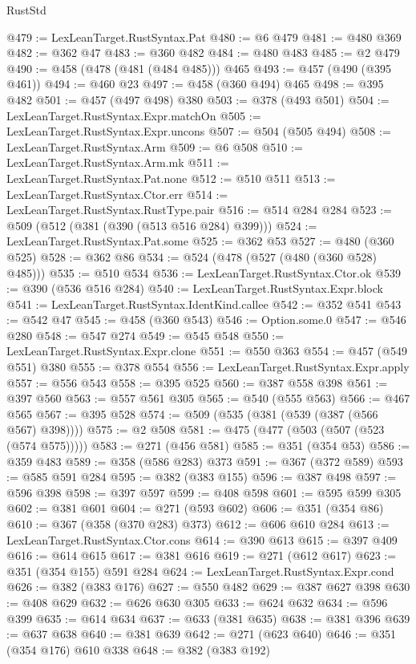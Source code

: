 \begin{lexlean}{RustStd}
\begin{coremodule}
@479 := LexLeanTarget.RustSyntax.Pat
@480 := @6 @479
@481 := @480 @369
@482 := @362 @47
@483 := @360 @482
@484 := @480 @483
@485 := @2 @479
@490 := @458 (@478 (@481 (@484 @485))) @465
@493 := @457 (@490 (@395 @461))
@494 := @460 @23
@497 := @458 (@360 @494) @465
@498 := @395 @482
@501 := @457 (@497 @498) @380
@503 := @378 (@493 @501)
@504 := LexLeanTarget.RustSyntax.Expr.matchOn
@505 := LexLeanTarget.RustSyntax.Expr.uncons
@507 := @504 (@505 @494)
@508 := LexLeanTarget.RustSyntax.Arm
@509 := @6 @508
@510 := LexLeanTarget.RustSyntax.Arm.mk
@511 := LexLeanTarget.RustSyntax.Pat.none
@512 := @510 @511
@513 := LexLeanTarget.RustSyntax.Ctor.err
@514 := LexLeanTarget.RustSyntax.RustType.pair
@516 := @514 @284 @284
@523 := @509 (@512 (@381 (@390 (@513 @516 @284) @399)))
@524 := LexLeanTarget.RustSyntax.Pat.some
@525 := @362 @53
@527 := @480 (@360 @525)
@528 := @362 @86
@534 := @524 (@478 (@527 (@480 (@360 @528) @485)))
@535 := @510 @534
@536 := LexLeanTarget.RustSyntax.Ctor.ok
@539 := @390 (@536 @516 @284)
@540 := LexLeanTarget.RustSyntax.Expr.block
@541 := LexLeanTarget.RustSyntax.IdentKind.callee
@542 := @352 @541
@543 := @542 @47
@545 := @458 (@360 @543)
@546 := Option.some.{0}
@547 := @546 @280
@548 := @547 @274
@549 := @545 @548
@550 := LexLeanTarget.RustSyntax.Expr.clone
@551 := @550 @363
@554 := @457 (@549 @551) @380
@555 := @378 @554
@556 := LexLeanTarget.RustSyntax.Expr.apply
@557 := @556 @543
@558 := @395 @525
@560 := @387 @558 @398
@561 := @397 @560
@563 := @557 @561 @305
@565 := @540 (@555 @563)
@566 := @467 @565
@567 := @395 @528
@574 := @509 (@535 (@381 (@539 (@387 (@566 @567) @398))))
@575 := @2 @508
@581 := @475 (@477 (@503 (@507 (@523 (@574 @575)))))
@583 := @271 (@456 @581)
@585 := @351 (@354 @53)
@586 := @359 @483
@589 := @358 (@586 @283) @373
@591 := @367 (@372 @589)
@593 := @585 @591 @284
@595 := @382 (@383 @155)
@596 := @387 @498
@597 := @596 @398
@598 := @397 @597
@599 := @408 @598
@601 := @595 @599 @305
@602 := @381 @601
@604 := @271 (@593 @602)
@606 := @351 (@354 @86)
@610 := @367 (@358 (@370 @283) @373)
@612 := @606 @610 @284
@613 := LexLeanTarget.RustSyntax.Ctor.cons
@614 := @390 @613
@615 := @397 @409
@616 := @614 @615
@617 := @381 @616
@619 := @271 (@612 @617)
@623 := @351 (@354 @155) @591 @284
@624 := LexLeanTarget.RustSyntax.Expr.cond
@626 := @382 (@383 @176)
@627 := @550 @482
@629 := @387 @627 @398
@630 := @408 @629
@632 := @626 @630 @305
@633 := @624 @632
@634 := @596 @399
@635 := @614 @634
@637 := @633 (@381 @635)
@638 := @381 @396
@639 := @637 @638
@640 := @381 @639
@642 := @271 (@623 @640)
@646 := @351 (@354 @176) @610 @338
@648 := @382 (@383 @192)

\end{coremodule}
\end{lexlean}
